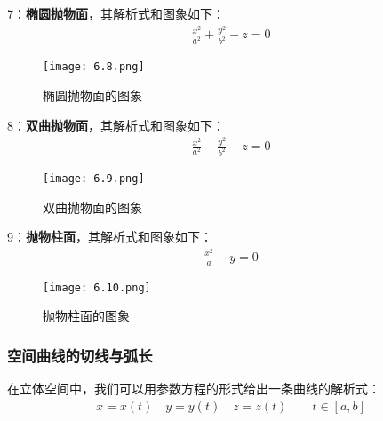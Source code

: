 \documentclass{ctexart}
\let\oldtextbf\textbf %
\renewcommand{\textbf}[1]{\textcolor{btex}{\oldtextbf{#1}}} %
\begin{document}
7：\textbf{椭圆抛物面}，其解析式和图象如下：
\begin{align*}
    \frac{x^2}{a^2}+\frac{y^2}{b^2}-z=0\tag{6-22}
\end{align*}

\begin{figure}[H]    
\centering     
\renewcommand{\figurename}{图}     
\renewcommand{\thefigure}{6.8}    
\begin{myimagebox}[width=0.23\textwidth] %
\texttt{[image: 6.8.png]} %
\end{myimagebox}     
\caption{\label{fig:6.8}椭圆抛物面的图象}   
\end{figure}

8：\textbf{双曲抛物面}，其解析式和图象如下：
\begin{align*}
    \frac{x^2}{a^2}-\frac{y^2}{b^2}-z=0\tag{6-23}
\end{align*}
\begin{figure}[H]    
\centering     
\renewcommand{\figurename}{图}     
\renewcommand{\thefigure}{6.9}    
\begin{myimagebox}[width=0.23\textwidth] %
\texttt{[image: 6.9.png]} %
\end{myimagebox}     
\caption{\label{fig:6.9}双曲抛物面的图象}   
\end{figure}

9：\textbf{抛物柱面}，其解析式和图象如下：
\begin{align*}
    \frac{x^2}{a}-y=0\tag{6-24}
\end{align*}
\begin{figure}[H]    
\centering     
\renewcommand{\figurename}{图}     
\renewcommand{\thefigure}{6.10}    
\begin{myimagebox}[width=0.23\textwidth] %
\texttt{[image: 6.10.png]} %
\end{myimagebox}     
\caption{\label{fig:6.10}抛物柱面的图象}   
\end{figure}

\subsubsection{空间曲线的切线与弧长}
在立体空间中，我们可以用参数方程的形式给出一条曲线的解析式：
\begin{align*}
    x=x(t) \quad  y=y(t)\quad z=z(t)\qquad t\in[a,b]
\end{align*}
\end{document}
